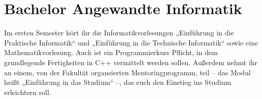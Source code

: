 \section{Bachelor Angewandte Informatik}

Im ersten Semester hört ihr die Informatikvorlesungen „Einführung in die Praktische Informatik“
und „Einführung in die Technische Informatik“ sowie eine Mathematikvorlesung.
Auch ist ein Programmierkurs Pflicht, in dem grundlegende Fertigkeiten in C++ vermittelt werden
sollen. Außerdem nehmt ihr an einem, von der Fakultät organsierten Mentoringprogramm, teil -- das Modul
heißt „Einführung in das Studium“ --, das euch den Einstieg ins Studium erleichtern soll.

